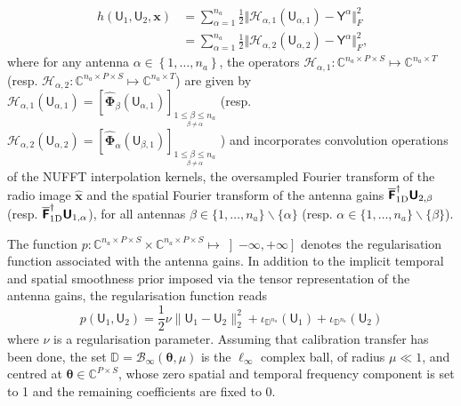 \documentclass[fleqn,usenatbib]{mnras}
\newcommand{\xb}{\ensuremath{\boldsymbol{x}}}
\newcommand{\Fb}{\ensuremath{\boldsymbol{\mathsf{F}}}}
\newcommand{\Ub}{\ensuremath{\boldsymbol{\mathsf{U}}}}
\newcommand{\Yb}{\ensuremath{\boldsymbol{\mathsf{Y}}}}
\newcommand{\Phib}{\ensuremath{\boldsymbol{\Phi}}}
\newcommand{\Hc}{\ensuremath{\mathcal{H}}}
\newcommand{\eC}{\mathbb{C}}
\newcommand{\eD}{\mathbb{D}}
\begin{document}
\begin{align}
~{h}(\Ub_{1}, \Ub_{2},\xb )	&= \sum_{\alpha = 1}^{n_a}\frac{1}{2} \Vert \Hc_{\alpha,1} \left( \Ub_{\alpha,1}\right) - \Yb^{\alpha} \Vert_F^2
\label{eq:data_fid_d_C1}	\\
 &= \sum_{\alpha = 1}^{n_a}\frac{1}{2} \Vert \Hc_{\alpha,2}\left( \Ub_{\alpha,2}\right) - \Yb^{\alpha} \Vert_F^2,
 \label{eq:data_fid_d_C2}
\end{align} 
where for any antenna $\alpha \in \left\lbrace 1,\dots,n_a\right \rbrace$, the operators $\Hc_{\alpha,1}:\eC^{n_a \times P \times S} \mapsto \eC^{n_a \times T}$ (resp. $\Hc_{\alpha,2}:\eC^{n_a \times P \times S} \mapsto \eC^{n_a \times T}$) are given by $\Hc_{\alpha,1}\left( \Ub_{\alpha,1}\right)= \left[\widehat{\Phib}_{\beta}\left( \Ub_{\alpha,1}\right) \right]_{\underset{\beta\neq \alpha}{ 1 \le \beta \le n_a}} $ (resp. $\Hc_{\alpha,2}\left( \Ub_{\alpha,2}\right)=\left[\widehat{\Phib}_{\alpha}\left( \Ub_{\beta,1}\right)\right]_{\underset{\beta\neq \alpha}{ 1 \le \beta \le n_a}} $ ) and incorporates convolution operations of the NUFFT interpolation kernels, the oversampled Fourier transform of the radio image $\widehat{\xb}$ and the spatial Fourier transform of the antenna gains $ \overline{\Fb}^\dagger_{{\rm 1D}}{\Ub}_{2,\beta}$ (resp. $ \overline{\Fb}^\dagger_{{\rm 1D}}{\Ub}_{1,\alpha}$), for all antennas $\beta \in \{1,\ldots, n_a \} \smallsetminus \{\alpha \}$ (resp. $\alpha \in \{1,\ldots, n_a \} \smallsetminus \{\beta \}$). 

\noindent
The function ${p}:\eC^{n_a \times P \times S} \times \eC^{n_a \times P \times S}\mapsto \left]-\infty,+\infty\right]$ denotes the regularisation function associated with the antenna gains. In addition to the implicit temporal and spatial smoothness prior imposed via the tensor representation of the antenna gains, the regularisation function reads
\begin{equation}
\label{eq:dde-prior}
 p(\Ub_1,\Ub_{2}) = \frac{1}{2} \nu \| \Ub_{1} -\Ub_{2} \|_2^2 + \iota_{\eD^{n_a}} (\Ub_{1})+ \iota_{\eD^{n_a}} (\Ub_{2})
\end{equation}
where $\nu $ is a regularisation parameter. Assuming that calibration transfer has been done, the set $\eD=\mathcal{B}_\infty(\boldsymbol{\theta},\mu)$ is the $\ell_\infty$ complex ball, of radius $\mu \ll 1$, and centred at ${\boldsymbol \theta}\in \eC^{P\times S}$, whose zero spatial and temporal frequency component is set to 1 and the remaining coefficients are fixed to 0. 
\end{document}
